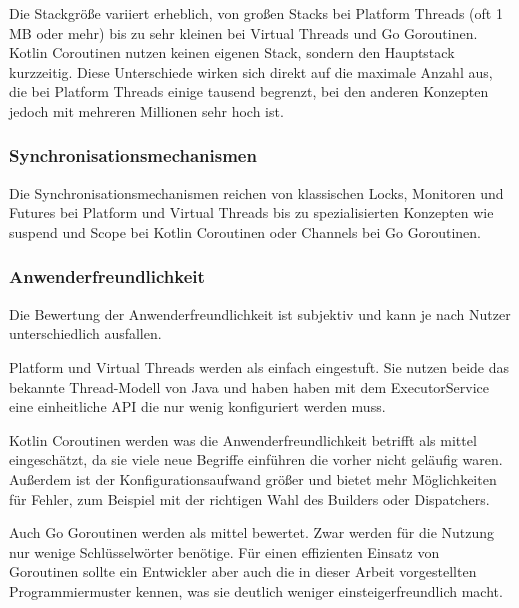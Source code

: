 \documentclass[fontsize=12pt,paper=a4,twoside=semi,parskip=half-,headsepline,headinclude]{scrreprt}
\begin{document}
Die Stackgröße variiert erheblich, von großen Stacks bei Platform Threads (oft 1 MB oder mehr) bis zu sehr kleinen bei Virtual Threads und Go Goroutinen. Kotlin Coroutinen nutzen keinen eigenen Stack, sondern den Hauptstack kurzzeitig. Diese Unterschiede wirken sich direkt auf die maximale Anzahl aus, die bei Platform Threads einige tausend begrenzt, bei den anderen Konzepten jedoch mit mehreren Millionen sehr hoch ist.

\subsubsection{Synchronisationsmechanismen}

Die Synchronisationsmechanismen reichen von klassischen Locks, Monitoren und Futures bei Platform und Virtual Threads bis zu spezialisierten Konzepten wie suspend und Scope bei Kotlin Coroutinen oder Channels bei Go Goroutinen. 

\subsubsection{Anwenderfreundlichkeit}

Die Bewertung der Anwenderfreundlichkeit ist subjektiv und kann je nach Nutzer unterschiedlich ausfallen. 

Platform und Virtual Threads werden als einfach  eingestuft. Sie nutzen beide das bekannte Thread-Modell von Java und haben haben mit dem ExecutorService eine einheitliche API die nur wenig konfiguriert werden muss. 

Kotlin Coroutinen werden was die Anwenderfreundlichkeit betrifft als mittel eingeschätzt, da sie viele neue Begriffe einführen die vorher nicht geläufig waren. Außerdem ist der Konfigurationsaufwand größer und bietet mehr Möglichkeiten für Fehler, zum Beispiel mit der richtigen Wahl des Builders oder Dispatchers. 

Auch Go Goroutinen werden als mittel bewertet. Zwar werden für die Nutzung nur wenige Schlüsselwörter benötige. Für einen effizienten Einsatz von Goroutinen sollte ein Entwickler aber auch die in dieser Arbeit vorgestellten Programmiermuster kennen, was sie deutlich weniger einsteigerfreundlich macht.
\end{document}
